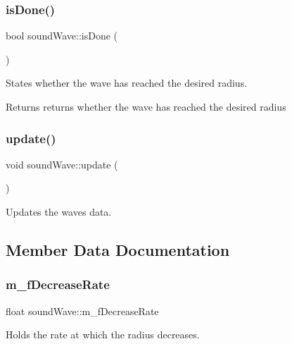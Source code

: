 \subsubsection{\texorpdfstring{is\+Done()}{isDone()}}
{\footnotesize\ttfamily bool sound\+Wave\+::is\+Done (\begin{DoxyParamCaption}{ }\end{DoxyParamCaption})}



States whether the wave has reached the desired radius. 

\begin{DoxyReturn}{Returns}
returns whether the wave has reached the desired radius 
\end{DoxyReturn}
\mbox{\label{classsound_wave_aafc6db924cda69359d9aa65ba75b28c6}} 
\subsubsection{\texorpdfstring{update()}{update()}}
{\footnotesize\ttfamily void sound\+Wave\+::update (\begin{DoxyParamCaption}{ }\end{DoxyParamCaption})}



Updates the waves data. 



\subsection{Member Data Documentation}
\mbox{\label{classsound_wave_ab32de1a5ff6f8f64a2ebf05f9707f3d9}} 
\subsubsection{\texorpdfstring{m\+\_\+f\+Decrease\+Rate}{m\_fDecreaseRate}}
{\footnotesize\ttfamily float sound\+Wave\+::m\+\_\+f\+Decrease\+Rate\hspace{0.3cm}{\ttfamily [private]}}



Holds the rate at which the radius decreases. 

